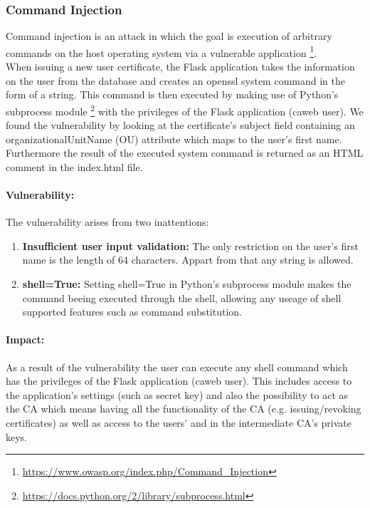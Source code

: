 \documentclass[english]{article}
\begin{document}
\subsubsection{Command Injection}
Command injection is an attack in which the goal is execution of arbitrary commands on the host operating system via a vulnerable application \footnote{\url{https://www.owasp.org/index.php/Command_Injection}}.\\
 When issuing a new user certificate, the Flask application takes the information on the user from the database and creates an openssl system command in the form of a string. This command is then executed by making use of Python's subprocess module \footnote{\url{https://docs.python.org/2/library/subprocess.html}} with the privileges of the Flask application (caweb user). 
 We found the vulnerability by looking at the certificate's subject field containing an organizationalUnitName (OU) attribute which maps to the user's first name. Furthermore the result of the executed system command is returned as an HTML comment in the index.html file.
 
 \paragraph{Vulnerability:}
 The vulnerability arises from two inattentions:
\begin{enumerate}
\item \textbf{Insufficient user input validation:} The only restriction on the user's first name is the length of 64 characters. Appart from that any string is allowed.
\item \textbf{shell=True:} Setting shell=True in Python's subprocess module makes the command beeing executed through the shell, allowing any useage of shell supported features such as command substitution. 
\end{enumerate}

\paragraph{Impact:} As a result of the vulnerability the user can execute any shell command which has the privileges of the Flask application (caweb user). This includes access to the application's settings (such as secret key) and also the possibility to act as the CA which means having all the functionality of the CA (e.g. issuing/revoking certificates) as well as access to the users' and in the intermediate CA's private keys.
\end{document}
